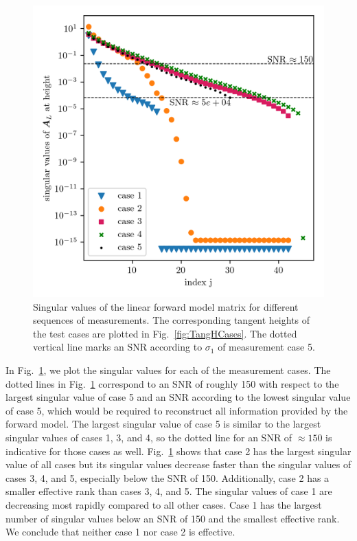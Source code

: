 \begin{figure}[ht!]
	\centering
	\includegraphics{SingValA.png}
	\caption[Singular values of linear forward model matrix for different sequences of measurements.]{Singular values of the linear forward model matrix for different sequences of measurements.
	The corresponding tangent heights of the test cases are plotted in Fig.~\ref{fig:TangHCases}. The dotted vertical line marks an SNR according to $\sigma_1$ of measurement case 5.}
\label{fig:SingA}
\end{figure}
In Fig.~\ref{fig:SingA}, we plot the singular values for each of the measurement cases.
The dotted lines in Fig.~\ref{fig:SingA} correspond to an SNR of roughly 150 with respect to the largest singular value of case 5 and an SNR according to the lowest singular value of case 5, which would be required to reconstruct all information provided by the forward model.
The largest singular value of case 5 is similar to the largest singular values of cases 1, 3, and 4, so the dotted line for an SNR of $\approx 150$ is indicative for those cases as well.
Fig.~\ref{fig:SingA} shows that case 2 has the largest singular value of all cases but its singular values decrease faster than the singular values of cases 3, 4, and 5, especially below the SNR of 150.
Additionally, case 2 has a smaller effective rank than cases 3, 4, and 5.
The singular values of case 1 are decreasing most rapidly compared to all other cases. Case 1 has the largest number of singular values below an SNR of 150 and the smallest effective rank.
We conclude that neither case 1 nor case 2 is effective.

